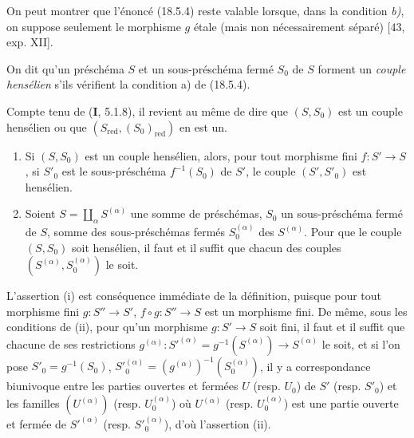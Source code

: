 \begin{remark}[18.5.4.4]
\label{IV.18.5.4.4}
On peut montrer que l'énoncé (18.5.4) reste valable lorsque, dans la condition \emph{b)}, on suppose seulement le morphisme $g$ étale (mais non nécessairement séparé) [43, exp. XII].
\end{remark}

\begin{definition}[18.5.5]
On dit qu'un préschéma $S$ et un sous-préschéma fermé $S_0$ de $S$ forment un \emph{couple hensélien} s'ils vérifient la condition \textup{a)} de \textup{(18.5.4)}.
\end{definition}

Compte tenu de (\textbf{I}, 5.1.8), il revient au même de dire que $(S,S_0)$ est un couple hensélien ou que $(S_{\mathrm{red}},(S_0)_{\mathrm{red}})$ en est un.

\begin{proposition}[18.5.6]
\label{IV.18.5.6}
\begin{enumerate}
  \item[\textup{(i)}] Si $(S,S_0)$ est un couple hensélien, alors, pour tout morphisme fini $f:S'\to S$, si $S'_0$ est le sous-préschéma $f^{-1}(S_0)$ de $S'$, le couple $(S',S'_0)$ est hensélien.
  \item[\textup{(ii)}] Soient $S=\coprod_\alpha S^{(\alpha)}$ une somme de préschémas, $S_0$ un sous-préschéma fermé de $S$, somme des sous-préschémas fermés $S_0^{(\alpha)}$ des $S^{(\alpha)}$. Pour que le couple $(S,S_0)$ soit hensélien, il faut et il suffit que chacun des couples $(S^{(\alpha)},S_0^{(\alpha)})$ le soit.
\end{enumerate}
\end{proposition}

L'assertion (i) est conséquence immédiate de la définition, puisque pour tout morphisme fini $g:S''\to S'$, $f\circ g:S''\to S$ est un morphisme fini. De même, sous les conditions de (ii), pour qu'un morphisme $g:S'\to S$ soit fini, il faut et il suffit que chacune
de ses restrictions $g^{(\alpha)}:S'^{(\alpha)}=g^{-1}(S^{(\alpha)})\to S^{(\alpha)}$ le soit, et si l'on pose $S'_0=g^{-1}(S_0)$, $S'^{(\alpha)}_0=(g^{(\alpha)})^{-1}(S^{(\alpha)}_0)$, il y a correspondance biunivoque entre les parties ouvertes et fermées $U$ (resp. $U_0$) de $S'$ (resp. $S'_0$) et les familles $(U^{(\alpha)})$ (resp. $U^{(\alpha)}_0$) où $U^{(\alpha)}$ (resp. $U^{(\alpha)}_0$) est une partie ouverte et fermée de $S'^{(\alpha)}$ (resp. $S'^{(\alpha)}_0$), d'où l'assertion (ii).

